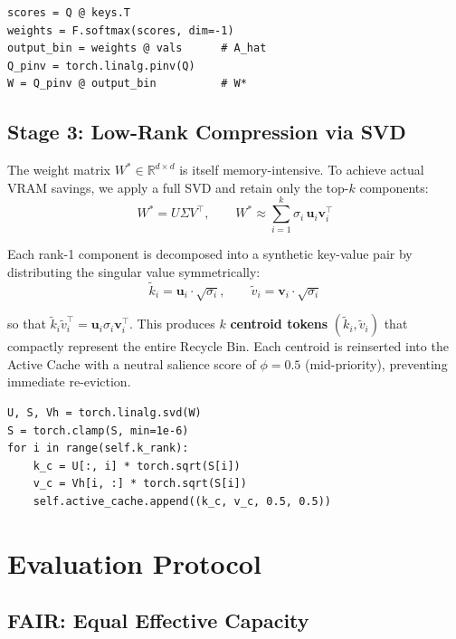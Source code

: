 \documentclass[11pt,a4paper]{article}
\begin{document}
\begin{lstlisting}[caption={OLS reconstruction inside \texttt{summarize\_bin} (PyTorch).}, label={lst:ols}]
scores = Q @ keys.T
weights = F.softmax(scores, dim=-1)
output_bin = weights @ vals      # A_hat
Q_pinv = torch.linalg.pinv(Q)
W = Q_pinv @ output_bin          # W*
\end{lstlisting}

\subsection{Stage 3: Low-Rank Compression via SVD}

The weight matrix $W^* \in \mathbb{R}^{d \times d}$ is itself memory-intensive. To achieve actual VRAM savings, we apply a full SVD and retain only the top-$k$ components:
\[
    W^* = U \Sigma V^\top, \qquad W^* \approx \sum_{i=1}^{k} \sigma_i \, \mathbf{u}_i \mathbf{v}_i^\top
\]

Each rank-1 component is decomposed into a synthetic key-value pair by distributing the singular value symmetrically:
\[
    \tilde{k}_i = \mathbf{u}_i \cdot \sqrt{\sigma_i}, \qquad \tilde{v}_i = \mathbf{v}_i \cdot \sqrt{\sigma_i}
\]

so that $\tilde{k}_i \tilde{v}_i^\top = \mathbf{u}_i \sigma_i \mathbf{v}_i^\top$. This produces $k$ \textbf{centroid tokens} $(\tilde{k}_i, \tilde{v}_i)$ that compactly represent the entire Recycle Bin. Each centroid is reinserted into the Active Cache with a neutral salience score of $\phi = 0.5$ (mid-priority), preventing immediate re-eviction.

\begin{lstlisting}[caption={SVD compression and centroid construction (PyTorch).}, label={lst:svd}]
U, S, Vh = torch.linalg.svd(W)
S = torch.clamp(S, min=1e-6)
for i in range(self.k_rank):
    k_c = U[:, i] * torch.sqrt(S[i])
    v_c = Vh[i, :] * torch.sqrt(S[i])
    self.active_cache.append((k_c, v_c, 0.5, 0.5))
\end{lstlisting}

\section{Evaluation Protocol}

\subsection{FAIR: Equal Effective Capacity}
\end{document}
